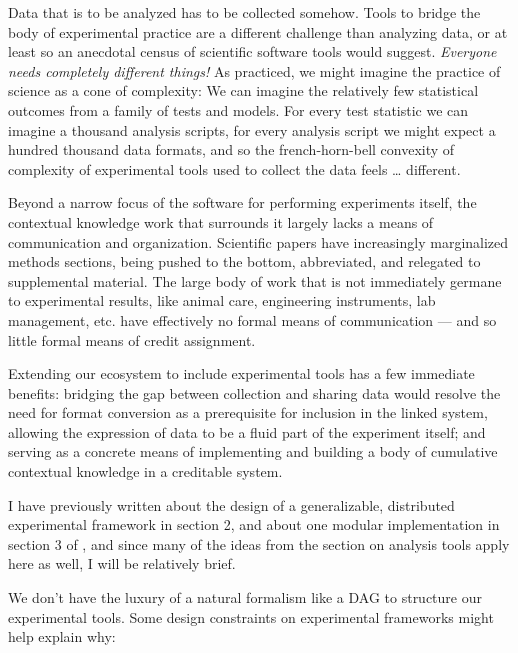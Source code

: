\documentclass[10pt]{article}
\begin{document}
\begin{multicols}{2}
 Data that is to be analyzed has to be collected somehow.
Tools to bridge the body of experimental practice are a different
challenge than analyzing data, or at least so an anecdotal census of
scientific software tools would suggest. \emph{Everyone needs completely
different things!} As practiced, we might imagine the practice of
science as a cone of complexity: We can imagine the relatively few
statistical outcomes from a family of tests and models. For every test
statistic we can imagine a thousand analysis scripts, for every analysis
script we might expect a hundred thousand data formats, and so the
french-horn-bell convexity of complexity of experimental tools used to
collect the data feels \ldots{} different.

Beyond a narrow focus of the software for performing experiments itself,
the contextual knowledge work that surrounds it largely lacks a means of
communication and organization. Scientific papers have increasingly
marginalized methods sections, being pushed to the bottom, abbreviated,
and relegated to supplemental material. The large body of work that is
not immediately germane to experimental results, like animal care,
engineering instruments, lab management, etc. have effectively no formal
means of communication --- and so little formal means of credit
assignment.

Extending our ecosystem to include experimental tools has a few
immediate benefits: bridging the gap between collection and sharing data
would resolve the need for format conversion as a prerequisite for
inclusion in the linked system, allowing the expression of data to be a
fluid part of the experiment itself; and serving as a concrete means of
implementing and building a body of cumulative contextual knowledge in a
creditable system.

I have previously written about the design of a generalizable,
distributed experimental framework in section 2, and about one modular
implementation in section 3 of \cite{saundersAutopilotAutomatingBehavioral2019} , and since many of the
ideas from the section on analysis tools apply here as well, I will be
relatively brief.

We don't have the luxury of a natural formalism like a DAG to structure
our experimental tools. Some design constraints on experimental
frameworks might help explain why:

\begin{itemize}


\end{itemize}
\end{multicols}
\end{document}
